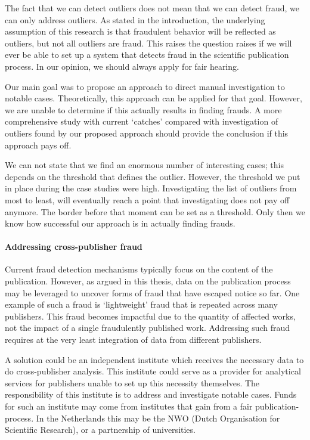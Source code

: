 \documentclass{ou-report}
\begin{document}
The fact that we can detect outliers does not mean that we can detect fraud, we
can only address outliers. As stated in the introduction, the underlying
assumption of this research is that fraudulent behavior will be reflected as
outliers, but not all outliers are fraud. This raises the question raises if we
will ever be able to set up a system that detects fraud in the scientific
publication process. In our opinion, we should always apply for fair hearing.


Our main goal was to propose an approach to direct manual investigation to 
notable cases. Theoretically, this approach can be applied for that goal. 
However, we are unable to determine if this actually results in finding frauds. 
A more comprehensive study with current ‘catches’ compared with investigation of 
outliers found by our proposed approach should provide the conclusion if this 
approach pays off.

We can not state that we find an enormous number of interesting cases; this 
depends on the threshold that defines the outlier. However, the threshold we 
put in place during the case studies were high. Investigating the list of 
outliers from most to least, will eventually reach a point that investigating 
does not pay off anymore. The border before that moment can be set as a 
threshold. Only then we know how successful our approach is in actually 
finding frauds.





\paragraph{Addressing cross-publisher fraud}
Current fraud detection mechanisms typically focus on the content of the 
publication. However, as argued in this thesis, data on the publication process 
may be leveraged to uncover forms of fraud that have escaped notice so far. One 
example of such a fraud is `lightweight' fraud that is repeated across many 
publishers. This fraud becomes impactful due to the quantity of affected works, 
not the impact of a single fraudulently published work.
Addressing such fraud requires at the very least integration of data from 
different publishers.

A solution could be an independent institute which receives the necessary data 
to do cross-publisher analysis. This institute could serve as a provider for
analytical services for publishers unable to set up this necessity themselves.
The responsibility of this institute is to address and investigate notable 
cases. Funds for such an institute may come from institutes that gain from a fair
publication-process. In the Netherlands this may be the NWO (Dutch Organisation
for Scientific Research), or a partnership of universities.
\end{document}
